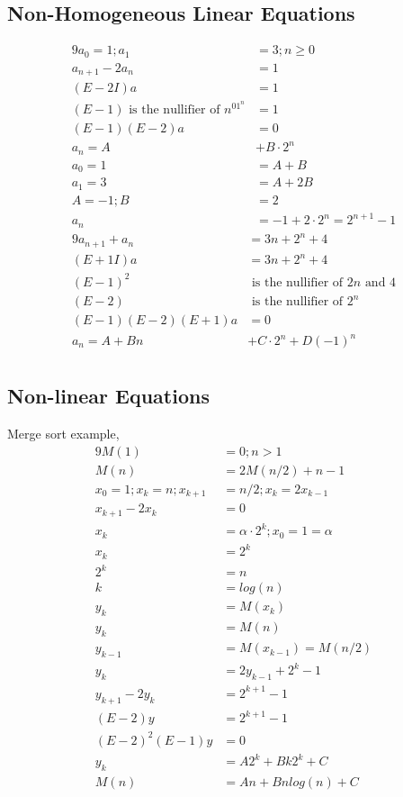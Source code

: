 \documentclass[12pt]{article}%
\begin{document}
\subsection{Non-Homogeneous Linear Equations}
\begin{alignat*}{9}
a_{0} = 1; a_{1} &= 3; n\geq 0 \\
a_{n+1} - 2a_{n} &= 1 \\
(E - 2I)a &= 1 \\
(E-1) \text{ is the nullifier of } n^01^n &= 1 \\
(E-1)(E-2)a &= 0 \\
a_n = A &+ B\cdot 2^n \\
a_0 = 1 &= A + B \\
a_1 = 3 &= A + 2B \\
A = -1; B &= 2 \\
a_n &= -1 + 2\cdot 2^n = 2^{n+1} - 1
\end{alignat*}
\begin{alignat*}{9}
a_{n+1} + a_{n} &= 3n + 2^n + 4 \\
(E + 1I)a &= 3n + 2^n + 4 \\
(E-1)^2 &\text{ is the nullifier of } 2n \text{ and } 4 \\
(E-2) &\text{ is the nullifier of } 2^n \\
(E-1)(E-2)(E+1)a &= 0 \\
a_n = A + Bn &+ C\cdot 2^n + D(-1)^n \\
\end{alignat*}

\subsection{Non-linear Equations}
Merge sort example,
\begin{alignat*}{9}
M(1) &= 0; n>1\\
M(n) &= 2M(n/2) + n - 1 \\
x_0 = 1; x_k = n; x_{k+1} &= n/2; x_k = 2x_{k-1} \\
x_{k+1} - 2x_k &= 0 \\
x_k &= \alpha \cdot 2^k; x_0 = 1 = \alpha \\
x_k &= 2^k \\
2^k &= n \\
k &= log(n) \\
y_k &= M(x_k) \\
y_k &= M(n) \\
y_{k-1} &= M(x_{k-1}) = M(n/2) \\
y_k &= 2y_{k-1} + 2^k -1 \\
y_{k+1} - 2y_k &= 2^{k+1} -1 \\
(E-2)y &= 2^{k+1} -1 \\
(E-2)^2(E-1)y &= 0 \\
y_k &= A2^k + Bk2^k + C \\
M(n) &= An + Bnlog(n) + C
\end{alignat*}
\end{document}
